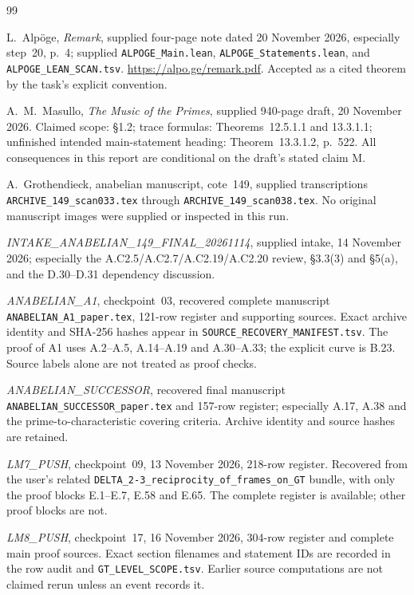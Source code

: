 \documentclass[11pt,a4paper]{article}
\begin{document}
\clearpage
\begin{thebibliography}{99}

L.~Alp\"oge, \emph{Remark}, supplied four-page note dated 20 November
2026, especially step~20, p.~4; supplied
\texttt{ALPOGE\_Main.lean}, \texttt{ALPOGE\_Statements.lean}, and
\texttt{ALPOGE\_LEAN\_SCAN.tsv}. \url{https://alpo.ge/remark.pdf}.
Accepted as a cited theorem by the task's explicit convention.

A.~M.~Masullo, \emph{The Music of the Primes}, supplied 940-page draft,
20 November 2026. Claimed scope: \S1.2; trace formulas:
Theorems~12.5.1.1 and 13.3.1.1; unfinished intended main-statement
heading: Theorem~13.3.1.2, p.~522. All consequences in this report
are conditional on the draft's stated claim M.

A.~Grothendieck, anabelian manuscript, cote~149, supplied
transcriptions \texttt{ARCHIVE\_149\_scan033.tex} through
\texttt{ARCHIVE\_149\_scan038.tex}. No original manuscript images
were supplied or inspected in this run.

\emph{INTAKE\_ANABELIAN\_149\_FINAL\_20261114}, supplied intake,
14 November 2026; especially the A.C2.5/A.C2.7/A.C2.19/A.C2.20
review, \S3.3(3) and \S5(a), and the D.30--D.31 dependency discussion.

\emph{ANABELIAN\_A1}, checkpoint~03, recovered complete manuscript
\texttt{ANABELIAN\_A1\_paper.tex}, 121-row register and supporting
sources. Exact archive identity and SHA-256 hashes appear in
\texttt{SOURCE\_RECOVERY\_MANIFEST.tsv}. The proof of A1 uses
A.2--A.5, A.14--A.19 and A.30--A.33; the explicit curve is B.23.
Source labels alone are not treated as proof checks.

\emph{ANABELIAN\_SUCCESSOR}, recovered final manuscript
\texttt{ANABELIAN\_SUCCESSOR\_paper.tex} and 157-row register;
especially A.17, A.38 and the prime-to-characteristic covering
criteria. Archive identity and source hashes are retained.

\emph{LM7\_PUSH}, checkpoint~09, 13 November 2026, 218-row register.
Recovered from the user's related
\texttt{DELTA\_2-3\_reciprocity\_of\_frames\_on\_GT} bundle,
with only the proof blocks E.1--E.7, E.58 and E.65.
The complete register is available; other proof blocks are not.

\emph{LM8\_PUSH}, checkpoint~17, 16 November 2026,
304-row register and complete main proof sources. Exact section
filenames and statement IDs are recorded in the row audit and
\texttt{GT\_LEVEL\_SCOPE.tsv}. Earlier source computations are not
claimed rerun unless an event records it.


\end{thebibliography}
\end{document}
